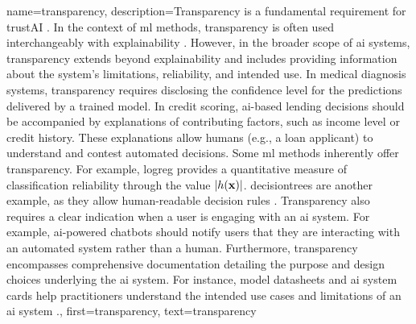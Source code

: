 
{name={transparency},
	description={Transparency is a fundamental requirement for 
		\gls{trustAI} \cite{HLEGTrustworhtyAI}. In the context of \gls{ml} 
		methods, transparency is often used interchangeably with \gls{explainability} 
		\cite{gallese2023ai,JunXML2020}. However, in the broader scope of \gls{ai} 
		systems, transparency extends beyond \gls{explainability} and includes providing information 
		about the system’s limitations, reliability, and intended use. 
		In medical diagnosis systems, transparency requires disclosing the confidence level 
		for the \gls{prediction}s delivered by a trained \gls{model}. In credit scoring, 
		\gls{ai}-based lending decisions should be accompanied by explanations of 
		contributing factors, such as income level or credit history. These explanations 
		allow humans (e.g., a loan applicant) to understand and contest automated decisions. 
		Some \gls{ml} methods inherently offer transparency. For example, \gls{logreg} 
		provides a quantitative measure of \gls{classification} reliability through the value $|h({\bf x})|$. 
		\Gls{decisiontree}s are another example, as they allow human-readable decision rules \cite{rudin2019stop}.
		Transparency also requires a clear indication when a user is engaging with an \gls{ai} system. 
		For example, \gls{ai}-powered chatbots should notify users that they are interacting with an 
		automated system rather than a human. Furthermore, transparency encompasses comprehensive 
		documentation detailing the purpose and design choices underlying the \gls{ai} system. 
		For instance, \gls{model} datasheets \cite{DatasheetData2021} and \gls{ai} system cards \cite{10.1145/3287560.3287596} 
		help practitioners understand the intended use cases and limitations of an \gls{ai} system \cite{Shahriari2017}.},
	first={transparency}, text={transparency} 
}



